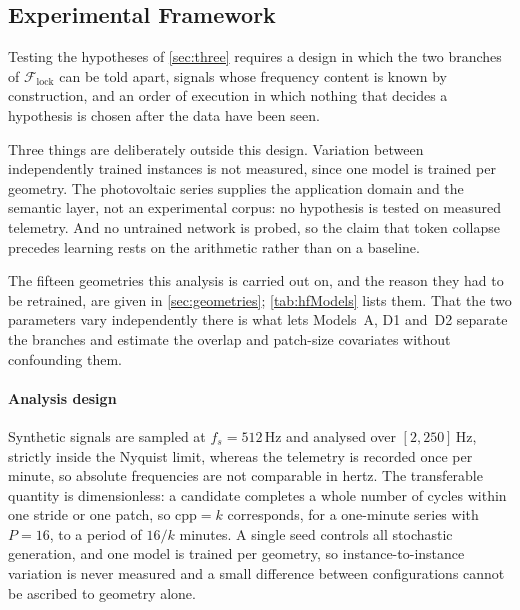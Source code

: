 \subsection{Experimental Framework}\label{sec:five}
\begingroup
\let\subsubsection\paragraph
\let\subsection\subsubsection
Testing the hypotheses of \autoref{sec:three} requires a design in which the two branches of $\mathcal F_{\mathrm{lock}}$ can be told apart, signals whose frequency content is known by construction, and an order of execution in which nothing that decides a hypothesis is chosen after the data have been seen.

Three things are deliberately outside this design. Variation between independently trained instances is not measured, since one model is trained per geometry. The photovoltaic series supplies the application domain and the semantic layer, not an experimental corpus: no hypothesis is tested on measured telemetry. And no untrained network is probed, so the claim that token collapse precedes learning rests on the arithmetic rather than on a baseline.

The fifteen geometries this analysis is carried out on, and the reason they had to be retrained, are given in \autoref{sec:geometries}; \autoref{tab:hfModels} lists them. That the two parameters vary independently there is what lets Models~A, D1 and~D2 separate the branches and estimate the overlap and patch-size covariates without confounding them.

\subsection{Analysis design}

Synthetic signals are sampled at $f_s=512$\,Hz and analysed over $[2,250]$\,Hz, strictly inside the Nyquist limit, whereas the telemetry is recorded once per minute, so absolute frequencies are not comparable in hertz. The transferable quantity is dimensionless: a candidate completes a whole number of cycles within one stride or one patch, so $\mathrm{cpp}=k$ corresponds, for a one-minute series with $P=16$, to a period of $16/k$ minutes. A single seed controls all stochastic generation, and one model is trained per geometry, so instance-to-instance variation is never measured and a small difference between configurations cannot be ascribed to geometry alone.

